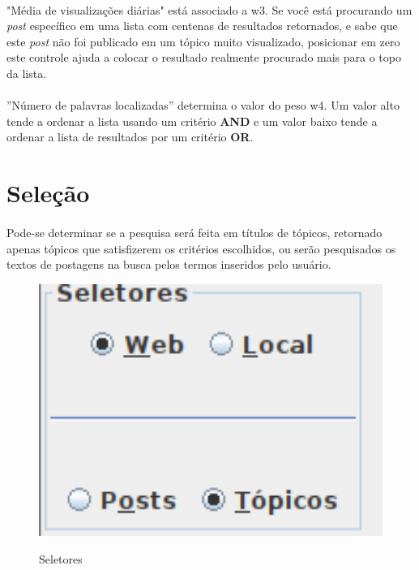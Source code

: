 \documentclass[a4paper,12pt,openany]{book}
\begin{document}
\paragraph{}
"Média de visualizações diárias" está associado a w3. Se você está procurando um \textit{post} específico em uma lista com centenas de resultados retornados, e sabe que este \textit{post} não foi publicado em um tópico muito visualizado, posicionar em zero este controle ajuda a colocar o resultado realmente procurado mais para o topo da lista.
\paragraph{}
”Número de palavras localizadas” determina o valor do peso w4. Um valor alto tende a ordenar a lista usando um critério \textbf{AND} e um valor baixo tende a ordenar a lista de resultados por um critério \textbf{OR}.

\section*{Seleção}

\paragraph{}
Pode-se determinar se a pesquisa será feita em títulos de tópicos, retornado apenas tópicos que satisfizerem os critérios escolhidos, ou serão pesquisados os textos de postagens na busca pelos termos inseridos pelo usuário.

\begin{figure}[h]
	\caption{Seletores}
	
	\centering %
	\includegraphics[width=15cm]{Figuras/seletores.png} %
	\label{figura:qualquernome}
\end{figure}
\end{document}
